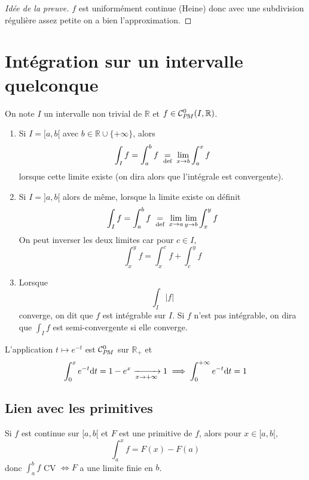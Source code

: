 \begin{proof}[Idée de la preuve]
    $f$ est uniformément continue (Heine) donc avec une subdivision régulière assez petite on a bien l'approximation.
\end{proof}

\section{Intégration sur un intervalle quelconque}

On note $I$ un intervalle non trivial de $\mathbb R$ et $f\in\CPM(I, \mathbb R)$.

\begin{dfn}
    \begin{enumerate}
        \item Si $I=[a, b[$ avec $b\in\mathbb R\cup \{+\infty\}$, alors \[
                \int_If=\int_a^bf\;\underset{\text{def}}=\;\lim_{x\to b}\int_a^xf
            \]
            lorsque cette limite existe (on dira alors que l'intégrale est convergente).
        \item Si $I=]a, b[$ alors de même, lorsque la limite existe on définit \[
                \int_If=\int_a^bf\;\underset{\text{def}}=\; \lim_{x\to a}\lim_{y\to b}\int_x^yf
            \]
            On peut inverser les deux limites car pour $c\in I$, \[
                \int_x^yf=\int_x^cf+\int_c^yf
            \]
        \item Lorsque \[
                \int_I|f|
            \]
            converge, on dit que $f$ est intégrable sur $I$. Si $f$ n'est pas intégrable, on dira que $\displaystyle\int_If$ est semi-convergente si elle converge.
    \end{enumerate}
\end{dfn}

\begin{ex}
    L'application $t\longmapsto e^{-t}$ est $\CPM$ sur $\mathbb R_+$ et \[
        \int_0^x e^{-t}\mathrm{d} t=1-e^x\xrightarrow[x\to+\infty]{}1\implies \int_0^{+\infty}e^{-t}\mathrm{d} t=1
    \]
\end{ex}

\subsection{Lien avec les primitives}

Si $f$ est continue sur $[a, b[$ et $F$ est une primitive de $f$, alors pour $x\in[a, b[$, \[
    \int_a^xf=F(x)-F(a)
\]
donc $\int_a^b f$ CV $\iff F$ a une limite finie en $b$.

